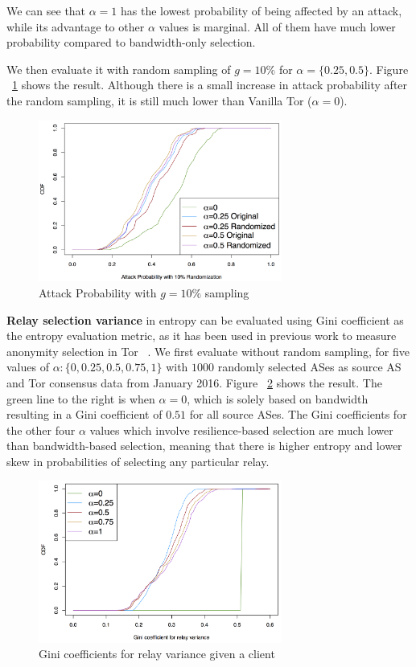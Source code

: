 We can see that $\alpha=1$ has the lowest probability of being affected by an attack, while its advantage to other $\alpha$ values is marginal. All of them have much lower probability compared to bandwidth-only selection. 

We then evaluate it with random sampling of $g=10\%$ for $\alpha=\{0.25, 0.5\}$. Figure ~\ref{fig_attack_random} shows the result. Although there is a small increase in attack probability after the random sampling, it is still much lower than Vanilla Tor ($\alpha=0$). 

\begin{figure}[ht!]
\centering
\includegraphics[width=80mm]{figure/attack_randomize}
\caption{Attack Probability with $g=10\%$ sampling \label{fig_attack_random}}
\end{figure}

\textbf{Relay selection variance} in entropy can be evaluated using Gini coefficient as the entropy evaluation metric, as it has been used in previous work to measure anonymity selection in Tor ~\cite{akhoondi2012lastor}. We first evaluate without  random sampling, for five values of $\alpha: \{0, 0.25, 0.5, 0.75, 1\}$ with $1000$ randomly selected ASes as source AS and Tor consensus data from January 2016. Figure ~\ref{fig_gini} shows the result. The green line to the right is when $\alpha = 0$, which is solely based on bandwidth resulting in a Gini coefficient of $0.51$ for all source ASes. The Gini coefficients for the other four $\alpha$ values which involve resilience-based selection are much lower than bandwidth-based selection, meaning that there is higher entropy and lower skew in probabilities of selecting any particular relay.

\begin{figure}[ht!]
\centering
\includegraphics[width=80mm]{figure/gini_relay_variance}
\caption{Gini coefficients for relay variance given a client \label{fig_gini}}
\end{figure}

